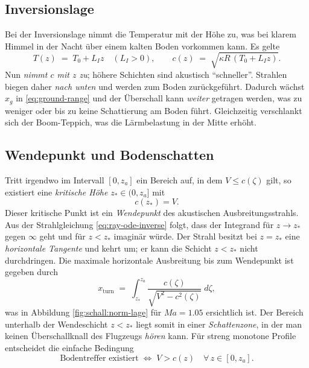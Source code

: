 \subsection*{Inversionslage}
Bei der Inversionslage nimmt die Temperatur mit der Höhe zu, was bei klarem
Himmel in der Nacht über einem kalten Boden vorkommen kann.
Es gelte
\begin{equation}
    T(z) \;=\; T_0 + L_{I} z \quad (L_{I}>0),
    \qquad
    c(z) \;=\; \sqrt{\kappa R\,(T_0 + L_{I} z)} .
    \label{eq:inversion}
\end{equation}
Nun \emph{nimmt $c$ mit $z$ zu}; höhere Schichten sind akustisch ``schneller''.
Strahlen biegen daher \emph{nach unten} und werden zum Boden zurückgeführt.
Dadurch wächst $x_g$ in \eqref{eq:ground-range} und der Überschall
kann \emph{weiter} getragen werden, was zu weniger oder bis zu keine
Schattierung am Boden führt.
Gleichzeitig verschlankt sich der Boom-Teppich, was die
Lärmbelastung in der Mitte erhöht.

\subsection*{Wendepunkt und Bodenschatten}
Tritt irgendwo im Intervall $[0,z_a]$ ein Bereich auf, in dem
$V\le c(\zeta)$ gilt, so existiert eine
\emph{kritische Höhe} $z_\ast\in(0,z_a]$ mit
\begin{equation}
    c(z_\ast)=V.
    \label{eq:turning-def}
\end{equation}
Dieser kritische Punkt ist ein \emph{Wendepunkt} des akustischen Ausbreitungsstrahls.
Aus der Strahlgleichung \eqref{eq:ray-ode-inverse} folgt, dass der
Integrand für $z\to z_\ast$ gegen $\boldsymbol{\infty}$ geht und für $z<z_\ast$ imaginär würde.
Der Strahl besitzt bei $z=z_\ast$ eine \emph{horizontale Tangente} und kehrt um;
er kann die Schicht $z<z_\ast$ nicht durchdringen.
Die maximale horizontale Ausbreitung bis zum Wendepunkt ist gegeben durch
\begin{equation}
    x_{\mathrm{turn}}
    \;=\; \int_{z_\ast}^{z_a} \frac{c(\zeta)}{\sqrt{V^2 - c^2(\zeta)}}\;d\zeta,
    \label{eq:x-turn}
\end{equation}
was in Abbildung \ref{fig:schall:norm-lage} für $\textit{Ma}=1.05$ ersichtlich ist.
Der Bereich unterhalb der Wendeschicht $z<z_\ast$ liegt somit in einer
\emph{Schattenzone}, in der man keinen Überschallknall des Flugzeugs \emph{hören} kann.
Für streng monotone Profile entscheidet die einfache Bedingung
\begin{equation}
    \text{Bodentreffer existiert} \;\Leftrightarrow\; V>c(z)\quad\forall\,z\in[0,z_a].
    \label{eq:ground-hit-condition}
\end{equation}

